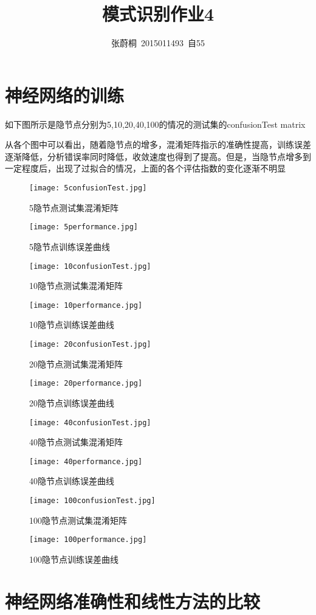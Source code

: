 \documentclass[UTF8,a4paper]{ctexart}
\title{模式识别作业4}
\author{张蔚桐\ 2015011493\ 自55}
\begin{document}
\maketitle
\section{神经网络的训练}
如下图所示是隐节点分别为5,10,20,40,100的情况的测试集的confusionTest matrix

从各个图中可以看出，随着隐节点的增多，混淆矩阵指示的准确性提高，训练误差逐渐降低，分析错误率同时降低，收敛速度也得到了提高。但是，当隐节点增多到一定程度后，出现了过拟合的情况，上面的各个评估指数的变化逐渐不明显
\begin{figure}
\texttt{[image: 5confusionTest.jpg]}
\caption{5隐节点测试集混淆矩阵}
\texttt{[image: 5performance.jpg]}
\caption{5隐节点训练误差曲线}
\end{figure}
\begin{figure}
\texttt{[image: 10confusionTest.jpg]}
\caption{10隐节点测试集混淆矩阵}
\texttt{[image: 10performance.jpg]}
\caption{10隐节点训练误差曲线}
\end{figure}
\begin{figure}
\texttt{[image: 20confusionTest.jpg]}
\caption{20隐节点测试集混淆矩阵}
\texttt{[image: 20performance.jpg]}
\caption{20隐节点训练误差曲线}
\end{figure}
\begin{figure}
\texttt{[image: 40confusionTest.jpg]}
\caption{40隐节点测试集混淆矩阵}
\texttt{[image: 40performance.jpg]}
\caption{40隐节点训练误差曲线}
\end{figure}
\begin{figure}
\texttt{[image: 100confusionTest.jpg]}
\caption{100隐节点测试集混淆矩阵}
\texttt{[image: 100performance.jpg]}
\caption{100隐节点训练误差曲线}
\end{figure}
\clearpage
\section{神经网络准确性和线性方法的比较}
\end{document}
